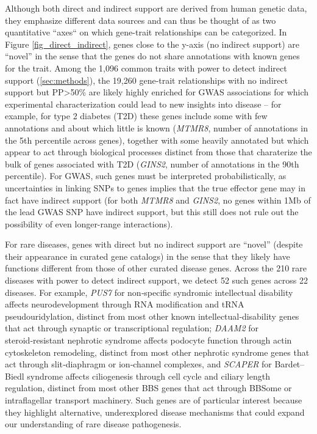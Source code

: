 \documentclass[sn-nature,lineno]{sn-jnl}%
\theoremstyle{thmstyleone}%
\theoremstyle{thmstyletwo}%
\theoremstyle{thmstylethree}%
\begin{document}
Although both direct and indirect support are derived from human genetic data, they emphasize different data sources and can thus be thought of as two quantitative ``axes`` on which gene-trait relationships can be categorized. In Figure \ref{fig_direct_indirect}, genes close to the y-axis (no indirect support) are ``novel'' in the sense that the genes do not share annotations with known genes for the trait. Among the 1,096 common traits with power to detect indirect support (\ref{sec:methods}), the 19,260 gene-trait relationships with no indirect support but PP>50\% are likely highly enriched for GWAS associations for which experimental characterization could lead to new insights into disease -- for example, for type 2 diabetes (T2D) these genes include some with few annotations and about which little is known (\textit{MTMR8}, number of annotations in the 5th percentile across genes), together with some heavily annotated but which appear to act through biological processes distinct from those that charaterize the bulk of genes associated with T2D (\textit{GINS2}, number of annotations in the 90th percentile). For GWAS, such genes must be interpreted probabilistically, as uncertainties in linking SNPs to genes implies that the true effector gene may in fact have indirect support (for both \textit{MTMR8} and \textit{GINS2}, no genes within 1Mb of the lead GWAS SNP have indirect support, but this still does not rule out the possibility of even longer-range interactions\cite{claussnitzer_fto_2015}).

For rare diseases, genes with direct but no indirect support are ``novel'' (despite their appearance in curated gene catalogs) in the sense that they likely have functions different from those of other curated disease genes. Across the 210 rare diseases with power to detect indirect support, we detect 52 such genes across 22 diseases. For example, {\it PUS7} for non‑specific syndromic intellectual disability affects neurodevelopment through RNA modification and tRNA pseudouridylation, distinct from most other known intellectual‑disability genes that act through synaptic or transcriptional regulation\cite{shaheen_pus7_2019}; {\it DAAM2} for steroid‑resistant nephrotic syndrome affects podocyte function through actin cytoskeleton remodeling, distinct from most other nephrotic syndrome genes that act through slit‑diaphragm or ion‑channel complexes\cite{schneider_daam2_2020}, and {\it SCAPER} for Bardet–Biedl syndrome affects ciliogenesis through cell cycle and ciliary length regulation, distinct from most other BBS genes that act through BBSome or intraflagellar transport machinery\cite{wormser_scaper_2019}. Such genes  are of particular interest because they highlight alternative, underexplored disease mechanisms that could expand our understanding of rare disease pathogenesis.
\end{document}
